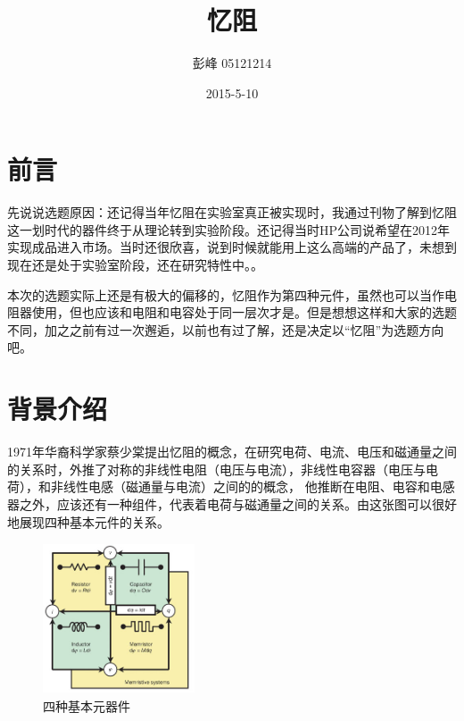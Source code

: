 \documentclass[UTF8]{article}
\begin{document}
 



\renewcommand{\contentsname}{\center{\huge 目\ \ \ 录}}
\author{    彭峰     05121214   }
 \date{2015-5-10}
\title{忆阻}  %
\titlelabel{\S\thetitle\quad}

\tableofcontents

\maketitle

\section{前言}

先说说选题原因：还记得当年忆阻在实验室真正被实现时，我通过刊物了解到忆阻这一划时代的器件终于从理论转到实验阶段。还记得当时HP公司说希望在2012年实现成品进入市场。当时还很欣喜，说到时候就能用上这么高端的产品了，未想到现在还是处于实验室阶段，还在研究特性中。。

本次的选题实际上还是有极大的偏移的，忆阻作为第四种元件，虽然也可以当作电阻器使用，但也应该和电阻和电容处于同一层次才是。但是想想这样和大家的选题不同，加之之前有过一次邂逅，以前也有过了解，还是决定以“忆阻”为选题方向吧。

\section{背景介绍}
1971年华裔科学家蔡少棠提出忆阻的概念，在研究电荷、电流、电压和磁通量之间的关系时，外推了对称的非线性电阻（电压与电流），非线性电容器（电压与电荷），和非线性电感（磁通量与电流）之间的的概念，
他推断在电阻、电容和电感器之外，应该还有一种组件，代表着电荷与磁通量之间的关系。由这张图可以很好地展现四种基本元件的关系。


\begin{figure}[htbp]
\centering
\includegraphics[width=1.77in,height=1.75in]{pic/memristor01.jpeg}
\caption{四种基本元器件}
\label{fig:m1}
\end{figure}
\end{document}
